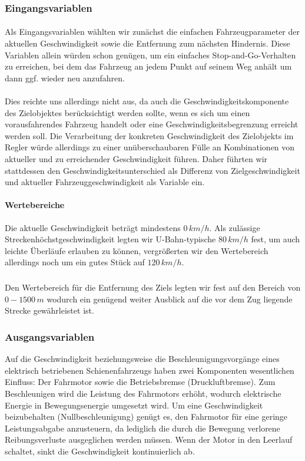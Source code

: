 \documentclass[10pt,a4paper]{article}
\begin{document}
\subsubsection{Eingangsvariablen}
\paragraph{}
Als Eingangsvariablen wählten wir zunächst die einfachen Fahrzeugparameter der aktuellen Geschwindigkeit sowie die Entfernung zum nächsten Hindernis. Diese Variablen allein würden schon genügen, um ein einfaches Stop-and-Go-Verhalten zu erreichen, bei dem das Fahrzeug an jedem Punkt auf seinem Weg anhält um dann ggf. wieder neu anzufahren.
\paragraph{}
Dies reichte uns allerdings nicht aus, da auch die Geschwindigkeitskomponente des Zielobjektes berücksichtigt werden sollte, wenn es sich um einen vorausfahrendes Fahrzeug handelt oder eine Geschwindigkeitsbegrenzung erreicht werden soll.
Die Verarbeitung der konkreten Geschwindigkeit des Zielobjekts im Regler würde allerdings zu einer unüberschaubaren Fülle an Kombinationen von aktueller und zu erreichender Geschwindigkeit führen. Daher führten wir stattdessen den Geschwindigkeitsunterschied als Differenz von Zielgeschwindigkeit und aktueller Fahrzeuggeschwindigkeit als Variable ein.
\paragraph{Wertebereiche}
Die aktuelle Geschwindigkeit beträgt mindestens $ 0\, km/h $. Als zulässige Streckenhöchstgeschwindigkeit legten wir U-Bahn-typische $ 80\, km/h $ fest, um auch leichte Überläufe erlauben zu können, vergrößerten wir den Wertebereich allerdings noch um ein gutes Stück auf $ 120\, km/h $.
\subparagraph{}
Den Wertebereich für die Entfernung des Ziels legten wir fest auf den Bereich von $ 0 - 1500 \, m $ wodurch ein genügend weiter Ausblick auf die vor dem Zug liegende Strecke gewährleistet ist.

\subsubsection{Ausgangsvariablen}
Auf die Geschwindigkeit beziehungsweise die Beschleunigungsvorgänge eines elektrisch betriebenen Schienenfahrzeugs haben zwei Komponenten wesentlichen Einfluss: Der Fahrmotor sowie die Betriebsbremse (Druckluftbremse). Zum Beschleunigen wird die Leistung des Fahrmotors erhöht, wodurch elektrische Energie in Bewegungsenergie umgesetzt wird. Um eine Geschwindigkeit beizubehalten (Nullbeschleunigung) genügt es, den Fahrmotor für eine geringe Leistungsabgabe anzusteuern, da lediglich die durch die Bewegung verlorene Reibungsverluste ausgeglichen werden müssen. Wenn der Motor in den Leerlauf schaltet, sinkt die Geschwindigkeit kontinuierlich ab.
\end{document}
